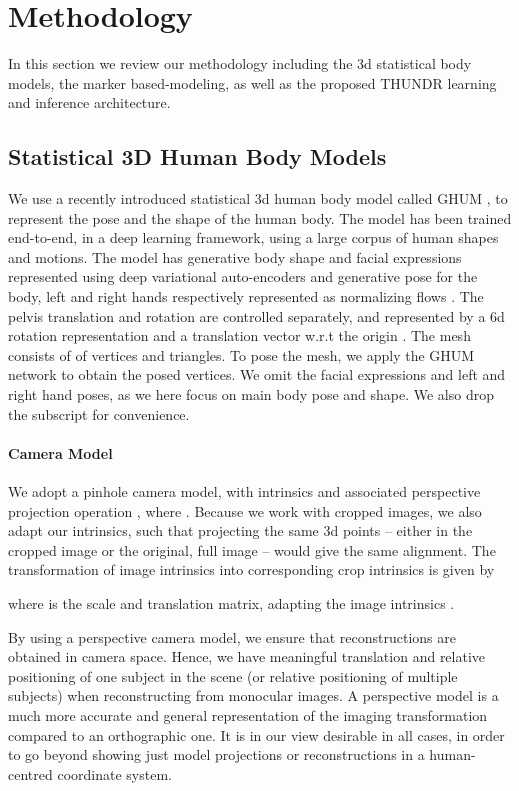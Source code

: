 \documentclass[10pt,twocolumn,letterpaper]{article}
\begin{document}
\section{Methodology}

In this section we review our methodology including the 3d statistical body models, the marker based-modeling, as well as the proposed THUNDR learning and inference architecture.

\subsection{Statistical 3D Human Body Models}
\label{subsection:GHUM_CAMERA}
We use a recently introduced statistical 3d human body model called GHUM \cite{ghum2020}, to represent the pose and the shape of the human body. The model has been trained end-to-end, in a deep learning framework, using a large corpus of human shapes and motions. 
The model has generative body shape and facial expressions  represented using deep variational auto-encoders and generative pose  for the body, left and right hands respectively represented as normalizing flows \cite{zanfir2020weakly}. The pelvis translation and rotation are controlled separately, and represented by a 6d rotation representation \cite{zhou2018continuity}  and a translation vector  w.r.t the origin . The mesh consists of of  vertices and  triangles. To pose the mesh, we apply the GHUM network  to obtain the posed vertices. We omit the facial expressions and left and right hand poses, as we here focus on main body pose and shape. We also drop the  subscript for convenience.

\vspace{-5mm}
\paragraph{Camera Model} We adopt a pinhole camera model, with intrinsics  and associated perspective projection operation , where . Because we work with cropped images, we also adapt our intrinsics, such that projecting the same 3d points -- either in the cropped image or the original, full image -- would give the same alignment.
The transformation of image intrinsics  into corresponding crop intrinsics  is given by

where  is the scale and translation matrix, adapting the image intrinsics . 

By using a perspective camera model, we ensure that reconstructions are obtained in camera space. Hence, we have meaningful translation and relative positioning of one subject in the scene (or relative positioning of multiple subjects) when reconstructing from monocular images. A perspective model is a much more accurate and general representation of the imaging transformation compared to an orthographic one. It is in our view desirable in all cases, in order to go beyond showing just model projections or reconstructions in a human-centred coordinate system.
\end{document}
